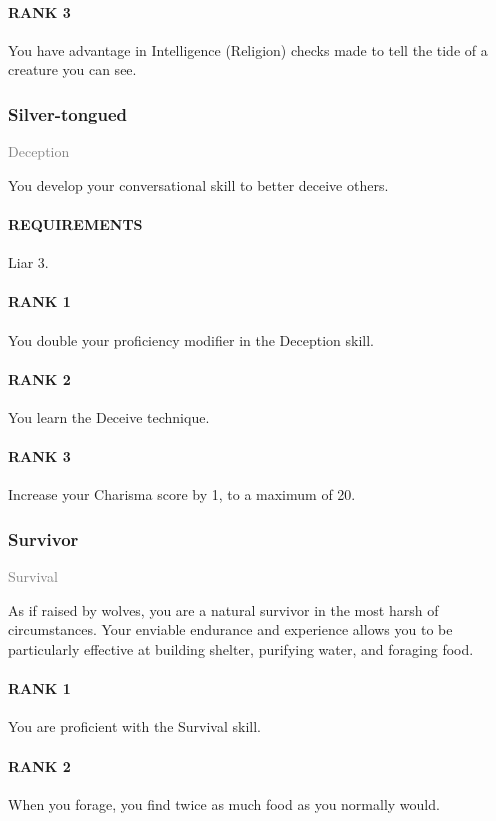 \paragraph{RANK 3} You have advantage in Intelligence (Religion) checks made to tell the tide of a creature you can see.

\subsubsection{Silver-tongued} \label{feat::silvertongued}
\small{\textcolor{gray}{Deception}}

\normalsize
You develop your conversational skill to better deceive others.
\paragraph{REQUIREMENTS} Liar 3.
\paragraph{RANK 1} You double your proficiency modifier in the Deception skill.
\paragraph{RANK 2} You learn the Deceive technique.
\paragraph{RANK 3} Increase your Charisma score by 1, to a maximum of 20.

\subsubsection{Survivor} \label{feat::survivor}
\small{\textcolor{gray}{Survival}}

\normalsize
As if raised by wolves, you are a natural survivor in the most harsh of circumstances.
Your enviable endurance and experience allows you to be particularly effective at building shelter, purifying water, and foraging food.
\paragraph{RANK 1} You are proficient with the Survival skill.
\paragraph{RANK 2} When you forage, you find twice as much food as you normally would.
